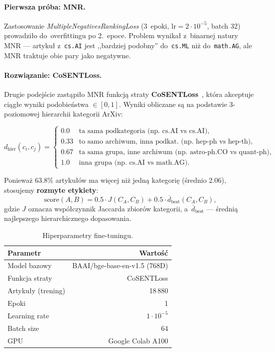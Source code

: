 \documentclass[a4paper,11pt]{article}
\begin{document}
\paragraph{Pierwsza próba: MNR.}
Zastosowanie \emph{MultipleNegativesRankingLoss} (3~epoki, $\text{lr}=2\cdot10^{-5}$, batch 32) prowadziło do~overfittingu po 2.~epoce.
Problem wynikał z~binarnej natury MNR --- artykuł z~\texttt{cs.AI} jest ,,bardziej podobny'' do~\texttt{cs.ML} niż do~\texttt{math.AG}, ale MNR traktuje obie pary jako negatywne.

\paragraph{Rozwiązanie: CoSENTLoss.}
Drugie podejście zastąpiło MNR funkcją straty \textbf{CoSENTLoss}~\cite{cosent2022}, która akceptuje ciągłe wyniki podobieństwa $\in [0, 1]$.
Wyniki obliczane są na podstawie 3-poziomowej hierarchii kategorii ArXiv:

\begin{equation}
d_{\text{hier}}(c_i, c_j) = \begin{cases}
  0.0  & \text{ta sama podkategoria (np.\ cs.AI vs cs.AI),} \\
  0.33 & \text{to samo archiwum, inna podkat.\ (np.\ hep-ph vs hep-th),} \\
  0.67 & \text{ta sama grupa, inne archiwum (np.\ astro-ph.CO vs quant-ph),} \\
  1.0  & \text{inna grupa (np.\ cs.AI vs math.AG).}
\end{cases}
\end{equation}

Ponieważ 63.8\% artykułów ma więcej niż jedną kategorię (średnio 2.06), stosujemy \textbf{rozmyte etykiety}:
\begin{equation}
\text{score}(A,B) = 0.5 \cdot J(C_A, C_B) + 0.5 \cdot \overline{d}_{\text{best}}(C_A, C_B),
\end{equation}
gdzie $J$ oznacza współczynnik Jaccarda zbiorów kategorii, a~$\overline{d}_{\text{best}}$ --- średnią najlepszego hierarchicznego dopasowania.

\begin{table}[H]
\centering
\caption{Hiperparametry fine-tuningu.}
\label{tab:finetuning}
\begin{tabular}{lr}
\toprule
Parametr & Wartość \\
\midrule
Model bazowy & BAAI/bge-base-en-v1.5 (768D) \\
Funkcja straty & CoSENTLoss \\
Artykuły (trening) & 18\,880 \\
Epoki & 1 \\
Learning rate & $1 \cdot 10^{-5}$ \\
Batch size & 64 \\
GPU & Google Colab A100 \\
\bottomrule
\end{tabular}
\end{table}
\end{document}
